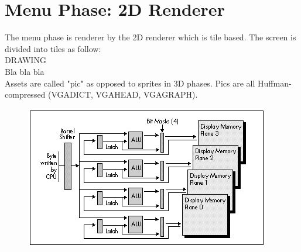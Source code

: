 \section{Menu Phase: 2D Renderer}
The menu phase is renderer by the 2D renderer which is tile based. The screen is divided into tiles as follow:\\
DRAWING\\
Bla bla bla\\
Assets are called "pic" as opposed to sprites in 3D phases. Pics  are all Huffman-compressed (VGADICT, VGAHEAD, 
VGAGRAPH).

 \begin{figure}[H]
\centering
 \includegraphics[width=\textwidth]{imgs/latches_drawing.png}
 \end{figure}

